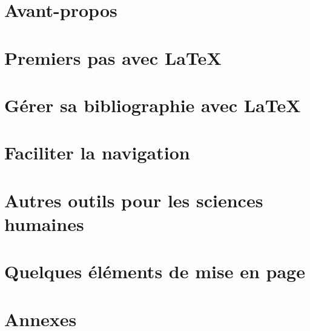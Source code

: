 \frontmatter
{}\part*{Avant-propos}

\newpage



\mainmatter

\part{Premiers pas avec \LaTeX}








\part{Gérer sa bibliographie avec \LaTeX}\label{bibliographie}








\part{Faciliter la navigation}




\part{Autres outils pour les sciences humaines}





\part{Quelques éléments de mise en page}





\appendix
\part{Annexes}











\setcounter{tocdepth}{2}
\tableofcontents

\makeatletter
\ifodd\c@TotPages
\newpage\hbox{}\newpage
\else
\newpage\hbox{}
\fi
\makeatother

